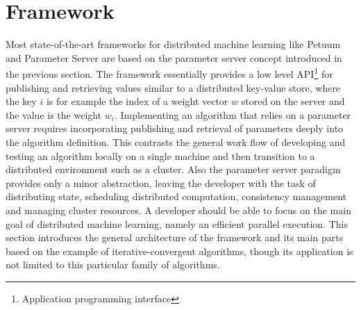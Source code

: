 
\chapter{Framework}
\label{c:state_centric}
Most state-of-the-art frameworks for distributed machine learning like Petuum \cite{Xing2015} and Parameter Server \cite{Li2014} are based on the parameter server concept introduced in the previous section.
The framework essentially provides a low level API\footnote{Application programming interface} for publishing and retrieving values similar to a distributed key-value store, where the key $i$ is for example the index of a weight vector $w$ stored on the server and the value is the weight $w_i$.
Implementing an algorithm that relies on a parameter server requires incorporating publishing and retrieval of parameters deeply into the algorithm definition.
This contrasts the general work flow of developing and testing an algorithm locally on a single machine and then transition to a distributed environment such as a cluster.
Also the parameter server paradigm provides only a minor abstraction, leaving the developer with the task of distributing state, scheduling distributed computation, consistency management and managing cluster resources.
A developer should be able to focus on the main goal of distributed machine learning, namely an efficient parallel execution.
This section introduces the general architecture of the framework and its main parts based on the example of iterative-convergent algorithms, though its application is not limited to this particular family of algorithms.

